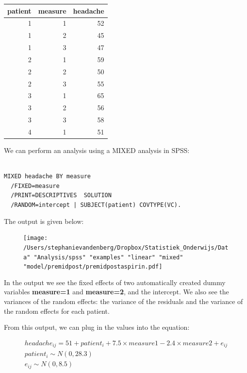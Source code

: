 \documentclass[]{report}\usepackage[]{graphicx}\usepackage[]{color}
\newenvironment{knitrout}{}{} %
\begin{document}
\begin{knitrout}
\color{fgcolor}
\begin{tabular}{r|r|r}
\hline
patient & measure & headache\\
\hline
1 & 1 & 52\\
\hline
1 & 2 & 45\\
\hline
1 & 3 & 47\\
\hline
2 & 1 & 59\\
\hline
2 & 2 & 50\\
\hline
2 & 3 & 55\\
\hline
3 & 1 & 65\\
\hline
3 & 2 & 56\\
\hline
3 & 3 & 58\\
\hline
4 & 1 & 51\\
\hline
\end{tabular}


\end{knitrout}

We can perform an analysis using a MIXED analysis in SPSS:

\begin{verbatim}

MIXED headache BY measure
  /FIXED=measure
  /PRINT=DESCRIPTIVES  SOLUTION
  /RANDOM=intercept | SUBJECT(patient) COVTYPE(VC).
\end{verbatim}

The output is given below:

\begin{figure}[h]
    \begin{center}
       \texttt{[image: /Users/stephanievandenberg/Dropbox/Statistiek\_Onderwijs/Data" "Analysis/spss" "examples" "linear" "mixed" "model/premidpost/premidpostaspirin.pdf]}
    \end{center}
\end{figure}


In the output we see the fixed effects of two automatically created dummy variables \textbf{measure=1} and \textbf{measure=2}, and the intercept. We also see the variances of the random effects: the variance of the residuals and the variance of the random effects for each patient.

From this output, we can plug in the values into the equation:


\begin{eqnarray}
headache_{ij} = 51 + patient_i +7.5 \times measure1 - 2.4 \times measure2 + e_{ij} \nonumber\\
patient_i \sim N(0, 28.3)\nonumber\\
e_{ij} \sim N(0, 8.5)\nonumber
\end{eqnarray}
\end{document}
